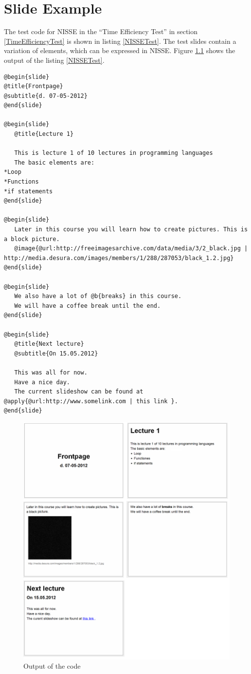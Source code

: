 \chapter{Slide Example}
\label{ASlideExample}
The test code for NISSE in the ``Time Efficiency Test'' in section \ref{TimeEfficiencyTest} is shown in listing \ref{NISSETest}.
The test slides contain a variation of elements, which can be expressed in NISSE.
Figure \ref{fig:EfficiencyTest} shows the output of the listing \ref{NISSETest}.

\begin{lstlisting}[frame=single,caption=Time efficiency test code for NISSE, label=NISSETest]
@begin{slide}
@title{Frontpage}
@subtitle{d. 07-05-2012}
@end{slide}

@begin{slide}
   @title{Lecture 1}
  
   This is lecture 1 of 10 lectures in programming languages
   The basic elements are:
*Loop
*Functions
*if statements
@end{slide}

@begin{slide}
   Later in this course you will learn how to create pictures. This is a block picture.
   @image{@url:http://freeimagesarchive.com/data/media/3/2_black.jpg | http://media.desura.com/images/members/1/288/287053/black_1.2.jpg}
@end{slide}

@begin{slide}
   We also have a lot of @b{breaks} in this course.
   We will have a coffee break until the end.
@end{slide}

@begin{slide}
   @title{Next lecture}
   @subtitle{On 15.05.2012}
  
   This was all for now.
   Have a nice day.
   The current slideshow can be found at @apply{@url:http://www.somelink.com | this link }.
@end{slide}

\end{lstlisting}


\begin{figure}[htbp]
	\centering
		\includegraphics[width=1.00\textwidth]{./images/EfficiencyTest.png}
	\caption{Output of the code}
	\label{fig:EfficiencyTest}
\end{figure}